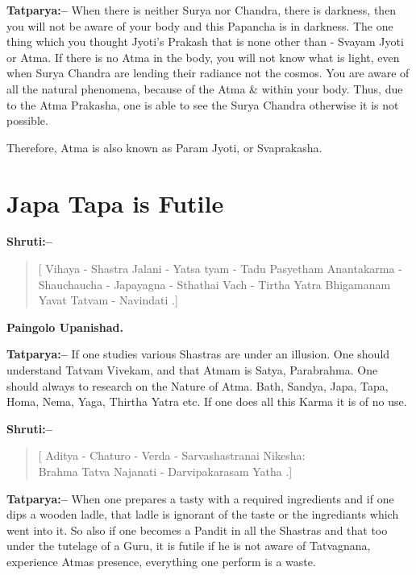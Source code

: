 \textbf{Tatparya:–} When there is neither Surya nor Chandra, there is darkness, then you will not be aware of your body and this Papancha is in darkness. The one thing which you thought Jyoti's Prakash that is none other than - Svayam Jyoti or Atma. If there is no Atma in the body, you will not know what is light, even when Surya Chandra are lending their radiance not the cosmos. You are aware of all the natural phenomena, because of the Atma \& within your body. Thus, due to the Atma Prakasha, one is able to see the Surya Chandra otherwise it is not possible.

Therefore, Atma is also known as Param Jyoti, or Svaprakasha.

\chapter{Japa Tapa is Futile}

\textbf{Shruti:–}

\begin{verse}
[ Vihaya - Shastra Jalani - Yatsa tyam - Tadu Pasye\break tham  Anantakarma - Shauchaucha - Japayagna - Sthathai Vach - Tirtha Yatra Bhigamanam Yavat Tatvam - Navindati .]
\end{verse}

\begin{flushright}
\textbf{Paingolo Upanishad.}
\end{flushright}

\textbf{Tatparya:–} If one studies various Shastras are under an illusion. One should understand Tatvam Vivekam, and that Atmam is Satya, Parabrahma. One should always to research on the Nature of Atma. Bath, Sandya, Japa, Tapa, Homa, Nema, Yaga, Thirtha Yatra etc. If one does all this Karma it is of no use.

\textbf{Shruti:–}

\begin{verse}
[ Aditya - Chaturo - Verda - Sarvashastranai Nikesha: \\ Brahma Tatva Najanati - Darvipakarasam Yatha .]
\end{verse}

\textbf{Tatparya:–} When one prepares a tasty with a required ingredients and if one dips a wooden ladle, that ladle is ignorant of the taste or the ingrediants which went into it. So also if one becomes a Pandit in all the Shastras and that too under the tutelage of a Guru, it is futile if he is not aware of Tatvagnana, experience Atmas presence, everything one perform is a waste.

